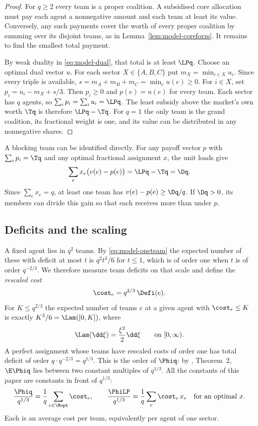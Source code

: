 \begin{proof}
For $q\ge2$ every team is a proper coalition. A subsidised core allocation
must pay each agent a nonnegative amount and each team at least its value.
Conversely, any such payments cover the worth of every proper coalition
by summing over its disjoint teams, as in Lemma~\ref{lem:model-coreform}.
It remains to find the smallest total payment.

By weak duality in \eqref{eq:model-dual}, that total is at least $\LPq$.
Choose an optimal dual vector $u$. For each sector $X\in\{A,B,C\}$ put
$m_X=\min_{i\in X}u_i$. Since every triple is available,
$s=m_A+m_B+m_C=\min_e u(e)\ge0$.
For $i\in X$, set $p_i=u_i-m_X+s/3$. Then $p_i\ge0$ and $p(e)=u(e)$ for every
team. Each sector has $q$ agents, so $\sum_i p_i=\sum_i u_i=\LPq$.
The least subsidy above the market's own worth $\Tq$ is therefore $\LPq-\Tq$.
For $q=1$ the only team is the grand coalition, its fractional weight is one,
and its value can be distributed in any nonnegative shares.
\end{proof}

A blocking team can be identified directly. For any payoff vector $p$ with
$\sum_i p_i=\Tq$ and any optimal fractional assignment $x$, the unit loads give
\[
 \sum_e x_e\bigl(v(e)-p(e)\bigr)=\LPq-\Tq=\Dq .
\]
Since $\sum_e x_e=q$, at least one team has $v(e)-p(e)\ge\Dq/q$. If $\Dq>0$,
its members can divide this gain so that each receives more than under $p$.

\subsection{Deficits and the scaling}\label{sec:model-scaling}

A fixed agent lies in $q^2$ teams. By \eqref{eq:model-oneteam} the expected number of these
with deficit at most $t$ is $q^2t^3/6$ for $t\le1$, which is of order one when $t$ is of order
$q^{-2/3}$. We therefore measure team deficits on that scale and define the \emph{rescaled
cost}
\begin{equation}\label{eq:model-cost}
\cost_e=q^{2/3}\,\Defi(e).
\end{equation}
For $K\le q^{2/3}$ the expected number of teams $e$ at a given agent with $\cost_e\le K$ is
exactly $K^3/6=\Lam([0,K])$, where
\begin{equation}\label{eq:model-Lam}
\Lam(\dd\xi)=\frac{\xi^2}{2}\dd\xi\qquad\text{on }[0,\infty).
\end{equation}
A perfect assignment whose teams have rescaled costs of order one has total deficit of order
$q\cdot q^{-2/3}=q^{1/3}$. This is the order of $\Phiq$: by \cite{FPT20}, Theorem~2,
$\E\Phiq$ lies between two constant multiples of $q^{1/3}$. All the constants of this paper
are constants in front of $q^{1/3}$:
\[
\frac{\Phiq}{q^{1/3}}=\frac1q\sum_{e\in\Mopt}\cost_e ,
\qquad
\frac{\PhiLP}{q^{1/3}}=\frac1q\sum_e\cost_e\,x_e\quad\text{for an optimal } x .
\]
Each is an average cost per team, equivalently per agent of one sector.


